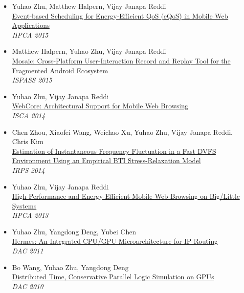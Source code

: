 \documentclass[margin, 9pt]{res} %
\begin{document}
\begin{resume}
\begin{itemize}[leftmargin=*]
	\item Yuhao Zhu, Matthew Halpern, Vijay Janapa Reddi\\[2pt]
          \href{http://yuhaozhu.com/pubs/hpca15.pdf}{Event-based Scheduling for Energy-Efficient QoS (eQoS) in Mobile Web Applications}\\
          \textit{HPCA 2015}

	\item Matthew Halpern, Yuhao Zhu, Vijay Janapa Reddi\\[2pt]
          \href{http://yuhaozhu.com/pubs/ispass15.pdf}{Mosaic: Cross-Platform User-Interaction Record and Replay Tool for the Fragmented Android Ecosystem}\\
          \textit{ISPASS 2015}

	\item Yuhao Zhu, Vijay Janapa Reddi\\[2pt]
          \href{http://yuhaozhu.com/pubs/isca14.pdf}{WebCore: Architectural Support for Mobile Web Browsing}\\
          \textit{ISCA 2014}

	\item Chen Zhou, Xiaofei Wang, Weichao Xu, Yuhao Zhu, Vijay Janapa Reddi, Chris Kim\\[2pt]
          \href{http://yuhaozhu.com/pubs/irps14.pdf}{Estimation of Instantaneous Frequency Fluctuation in a Fast DVFS Environment Using an Empirical BTI Stress-Relaxation Model}\\
          \textit{IRPS 2014}

	\item Yuhao Zhu, Vijay Janapa Reddi\\[2pt]
          \href{http://yuhaozhu.com/pubs/hpca13.pdf}{High-Performance and Energy-Efficient Mobile Web Browsing on Big/Little Systems}\\
          \textit{HPCA 2013}

	\item Yuhao Zhu, Yangdong Deng, Yubei Chen\\[2pt]
          \href{http://yuhaozhu.com/pubs/dac11.pdf}{Hermes: An Integrated CPU/GPU Microarchitecture for IP Routing}\\
          \textit{DAC 2011}

	\item Bo Wang, Yuhao Zhu, Yangdong Deng\\[2pt]
          \href{http://yuhaozhu.com/pubs/dac10.pdf}{Distributed Time, Conservative Parallel Logic Simulation on GPUs}\\
          \textit{DAC 2010}
\end{itemize}
 

\end{resume}
\end{document}
